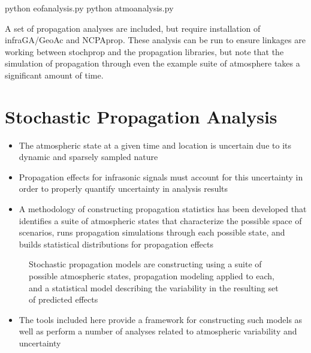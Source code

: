 \documentclass[letterpaper,10pt,english]{sphinxmanual}
\let\sphinxpxdimen\pdfpxdimen\else\newdimen\sphinxpxdimen
\begin{document}
\begin{sphinxVerbatim}[commandchars=\\\{\}]
\PYGZgt{}\PYGZgt{} python eof\PYGZus{}analysis.py
\PYGZgt{}\PYGZgt{} python atmo\PYGZus{}analysis.py
\end{sphinxVerbatim}

A set of propagation analyses are included, but require installation of infraGA/GeoAc and NCPAprop.  These analysis can be run to ensure linkages are
working between stochprop and the propagation libraries, but note that the simulation of propagation through even the example suite of atmosphere
takes a significant amount of time.


\section{Stochastic Propagation Analysis}
\label{\detokenize{analysis:stochastic-propagation-analysis}}\label{\detokenize{analysis:analysis}}\label{\detokenize{analysis::doc}}\begin{itemize}
\item {} 
The atmospheric state at a given time and location is uncertain due to its dynamic and sparsely sampled nature

\item {} 
Propagation effects for infrasonic signals must account for this uncertainty in order to properly quantify uncertainty in analysis results

\item {} 
A methodology of constructing propagation statistics has been developed that identifies a suite of atmospheric states that characterize the possible space of scenarios, runs propagation simulations through each possible state, and builds statistical distributions for propagation effects

\end{itemize}

\begin{figure}[htbp]
\centering
\capstart

\noindent\sphinxincludegraphics[width=500\sphinxpxdimen]{{stochprop_fig1}.jpg}
\caption{Stochastic propagation models are constructing using a suite of possible atmospheric states, propagation modeling applied to each, and a statistical model describing the variability in the resulting set of predicted effects}\label{\detokenize{analysis:id1}}\end{figure}
\begin{itemize}
\item {} 
The tools included here provide a framework for constructing such models as well as perform a number of analyses related to atmospheric variability and uncertainty

\end{itemize}
\end{document}
